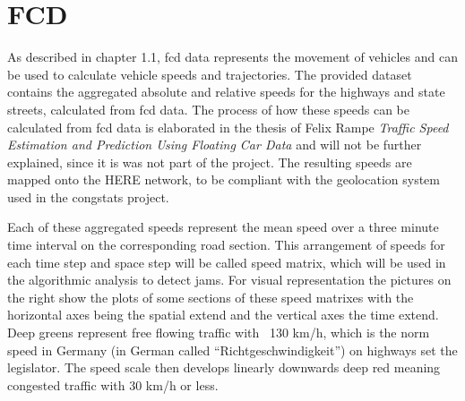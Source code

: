 \documentclass[a4paper,12pt]{report}
\begin{document}
\section{FCD}
\label{dataset_fcd}
As described in chapter 1.1, \acrshort{fcd} data represents the movement of vehicles and can be used to calculate vehicle speeds and trajectories. The provided dataset contains the aggregated absolute and relative speeds for the highways and state streets, calculated from \acrshort{fcd} data. The process of how these speeds can be calculated from \acrshort{fcd} data is elaborated in the thesis of Felix Rampe \textit{Traffic Speed Estimation and Prediction Using Floating Car Data} \cite{Rempe2018} and will not be further explained, since it is was not part of the project. The resulting speeds are mapped onto the HERE \cite{HERE2020} network, to be compliant with the geolocation system used in the \gls{congstats} project.
\par Each of these aggregated speeds represent the mean speed over a three minute time interval on the corresponding road section. This arrangement of speeds for each time step and space step will be called speed matrix, which will be used in the algorithmic analysis to detect jams. For visual representation the pictures on the right show the plots of some sections of these speed matrixes with the horizontal axes being the spatial extend and the vertical axes the time extend. Deep greens represent free flowing traffic with ~130 km/h, which is the norm speed in Germany (in German called “Richtgeschwindigkeit”) on highways set the legislator. The speed scale then develops linearly downwards deep red meaning congested traffic with 30 km/h or less. 
\end{document}
